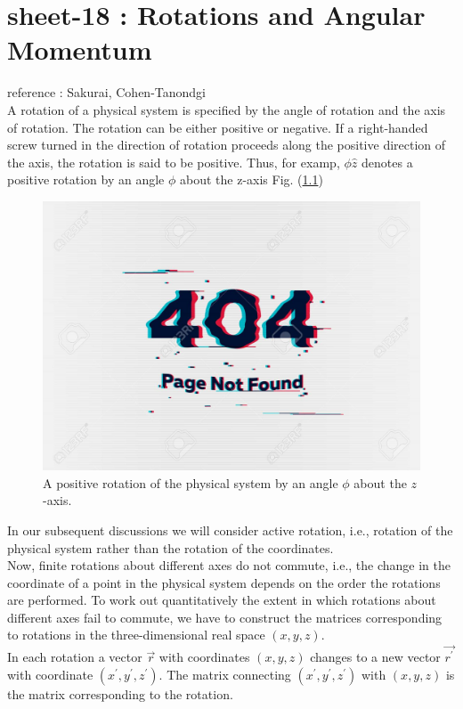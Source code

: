 
\chapter{sheet-18 : Rotations and Angular Momentum}

\ifpdf
\graphicspath{{Chapter18/figs/}}
\else
\graphicspath{{Chapter18/figs/}}
\fi

reference : Sakurai, Cohen-Tanondgi\\

A rotation of a physical system is specified by the angle of rotation and the axis of rotation. The rotation can be either positive or negative. If a right-handed screw turned in the direction of rotation proceeds along the positive direction of the axis, the rotation is said to be positive. Thus, for examp, $\phi\hat{z}$ denotes a positive rotation by an angle $\phi$ about the z-axis Fig. (\ref{chapter18.fig1})

\begin{figure}
	\centering
	\includegraphics[width=0.5\linewidth]{Pictures/not-found.jpg}
	\caption{A positive rotation of the physical system by an angle $\phi$ about the $z$-axis.}
	\label{chapter18.fig1}
\end{figure}
In our subsequent discussions we will consider active rotation, i.e., rotation of the physical system rather than the rotation of the coordinates.\\

Now, finite rotations about different axes do not commute, i.e., the change in the coordinate of a point in the physical system depends on the order the rotations are performed. To work out quantitatively the extent in which rotations about different axes fail to commute, we have to construct the matrices corresponding to rotations in the three-dimensional real space $(x,y,z)$.\\

In each rotation a vector $\vec{r}$ with coordinates $(x, y, z)$ changes to a new vector $\vec{r^\prime}$ with coordinate $(x^\prime,y^\prime,z^\prime)$. The matrix connecting $(x^\prime,y^\prime,z^\prime)$ with $(x,y,z)$ is the matrix corresponding to the rotation.

